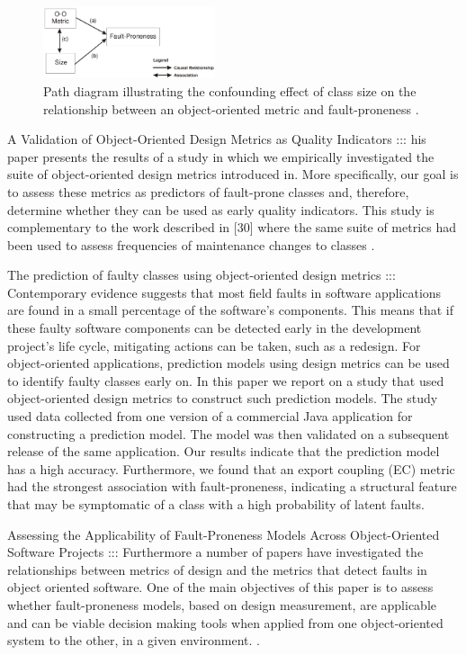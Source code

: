 \begin{figure}[htbp]
	\centerline{\includegraphics[width=0.45\textwidth]{pictures/faultyclasses2.png}}
	\caption{Path diagram illustrating the confounding effect of class size on the relationship between an object-oriented metric and fault-proneness \cite{b7radjenovic2013software}.}
	\label{fig3}
\end{figure}


A Validation of Object-Oriented Design Metrics as Quality Indicators ::: his paper presents the results of a study in which we empirically investigated the suite of object-oriented design metrics introduced in. More specifically, our goal is to assess these metrics as predictors of fault-prone classes and, therefore, determine whether they can be used as early quality indicators. This study is complementary to the work described in [30] where the same suite of metrics had been used to assess frequencies of maintenance changes to classes \cite{b11basili1996validation}.

The prediction of faulty classes using object-oriented design metrics ::: \cite{b10el2001prediction} Contemporary evidence suggests that most field faults in software applications are found in a small percentage of the software's components. This means that if these faulty software components can be detected early in the development project's life cycle, mitigating actions can be taken, such as a redesign. For object-oriented applications, prediction models using design metrics can be used to identify faulty classes early on. In this paper we report on a study that used object-oriented design metrics to construct such prediction models. The study used data collected from one version of a commercial Java application for constructing a prediction model. The model was then validated on a subsequent release of the same application. Our results indicate that the prediction model has a high accuracy. Furthermore, we found that an export coupling (EC) metric had the strongest association with fault-proneness, indicating a structural feature that may be symptomatic of a class with a high probability of latent faults.


Assessing the Applicability of Fault-Proneness Models Across Object-Oriented Software Projects ::: Furthermore a number of papers have investigated the relationships between metrics of design and the metrics that detect faults in object oriented software. One of the main objectives of this paper is to assess whether fault-proneness models, based on design measurement, are applicable and can be viable decision making tools when applied from one object-oriented system to the other, in a given environment. \cite{b12riand2002assessing}.



